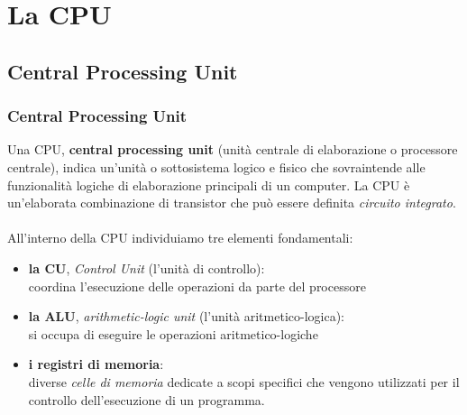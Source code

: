 \section[La CPU]{La CPU}
\label{sec:cpu}


\subsection[Central Processing Unit]{Central Processing Unit}
\begin{frame}
	\frametitle{Central Processing Unit}
	
		Una CPU, \textbf{central processing unit} (unità centrale di elaborazione o processore centrale), indica un'unità o sottosistema logico e fisico che sovraintende alle funzionalità logiche di elaborazione principali di un computer.
		La CPU è un'elaborata combinazione di transistor che può essere definita \textit{circuito integrato}.\\~\\
		\pause
		All'interno della CPU individuiamo tre elementi fondamentali:
		\begin{itemize}
			\item \textbf{la CU}, \textit{Control Unit} (l’unità di controllo):\\
			coordina l'esecuzione delle operazioni da parte del processore
			\item \textbf{la ALU}, \textit{arithmetic-logic unit} (l’unità aritmetico-logica):\\
			si occupa di eseguire le operazioni aritmetico-logiche
			\item \textbf{i registri di memoria}:\\
			diverse \textit{celle di memoria} dedicate a scopi specifici che vengono utilizzati per il controllo dell'esecuzione di un programma.
		\end{itemize}
	
\end{frame}
